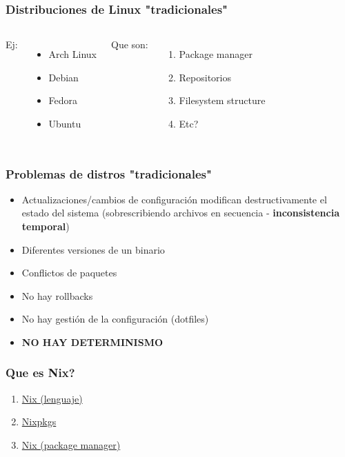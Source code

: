 \documentclass[aspectratio=43]{beamer}
\begin{document}
\begin{frame}
    \frametitle{Distribuciones de Linux "tradicionales"}
        \begin{columns}
        Ej:
        \begin{itemize}
            \item{Arch Linux}
            \item{Debian}
            \item{Fedora}
            \item{Ubuntu}
        \end{itemize}
        Que son:
        \begin{enumerate}
            \item Package manager
            \item Repositorios
            \item Filesystem structure
            \item Etc?
        \end{enumerate}
    \end{columns}
\end{frame}

\begin{frame}
    \frametitle{Problemas de distros "tradicionales"}
    \begin{itemize}
        \item Actualizaciones/cambios de configuración modifican destructivamente el estado del sistema (sobrescribiendo archivos en secuencia -\> \textbf{inconsistencia temporal})
        \item Diferentes versiones de un binario
        \item Conflictos de paquetes
        \item No hay rollbacks
        \item No hay gestión de la configuración (dotfiles)
        \item\textbf{NO HAY DETERMINISMO}
    \end{itemize}
\end{frame}

\begin{frame}
    \frametitle{Que es Nix?}
    
    \begin{enumerate}[I]
    \item{\href{https://nix.dev/tutorials/nix-language}{Nix (lenguaje)}}
    \item{\href{https://github.com/NixOS/nixpkgs}{Nixpkgs}}
    \item{\href{https://github.com/NixOS/nix}{Nix (package manager)}}
    \end{enumerate}

\end{frame}
\end{document}
